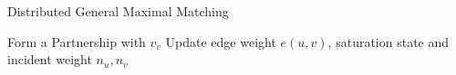 \begin{algorithm}
\caption{Distributed General Maximal Matching}
\begin{algorithmic}
\STATE Form a Partnership with $v_v$
\STATE Update edge weight $e(u,v)$, saturation state and incident weight ${n_u, n_v}$
\ENDFOR
\ENDFOR
\end{algorithmic}
\label{alg:dgmm}
\end{algorithm}